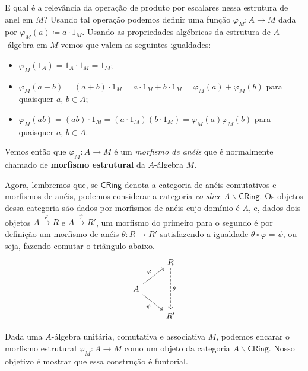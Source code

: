 E qual é a relevância da operação de produto por escalares nessa estrutura de anel em $M$?
Usando tal operação podemos definir uma função $\varphi_M: A \to M$ dada por $\varphi_M(a) \coloneqq a \cdot 1_M$.
Usando as propriedades algébricas da estrutura de $A$-álgebra em $M$ vemos que valem as seguintes igualdades:
\begin{itemize}
\item $\varphi_M(1_A) = 1_A \cdot 1_M = 1_M$;
  
\item $\varphi_M(a+b) = (a+b) \cdot 1_M = a \cdot 1_M + b \cdot 1_M = \varphi_M(a) + \varphi_M(b)$ para quaisquer $a,\, b \in A$;
  
\item $\varphi_M(ab) = (ab) \cdot 1_M = (a \cdot 1_M)(b \cdot 1_M) = \varphi_M(a)\varphi_M(b)$ para quaisquer $a,\, b \in A$.
\end{itemize}

Vemos então que $\varphi_M: A \to M$ é um \emph{morfismo de anéis} que é normalmente chamado de \textbf{morfismo estrutural} da $A$-álgebra $M$.

Agora, lembremos que, se $\mathsf{CRing}$ denota a categoria de anéis comutativos e morfismos de anéis, podemos considerar a categoria \emph{co-slice} $A\backslash \mathsf{CRing}$.
Os objetos dessa categoria são dados por morfismos de anéis cujo domínio é $A$, e, dados dois objetos $A \overset{\varphi}{\to} R$ e $A \overset{\psi}{\to} R'$, um morfismo do primeiro para o segundo é por definição um morfismo de anéis $\theta: R \to R'$ satisfazendo a igualdade $\theta \circ \varphi = \psi$, ou seja, fazendo comutar o triângulo abaixo.
\begin{displaymath}
  \begin{tikzcd}
    & R
    \arrow[dd, dashed, "\theta"]
    \\ A
    \arrow[ru, "\varphi"]
    \arrow[rd, "\psi" swap]
    \\ & R'
  \end{tikzcd}
\end{displaymath}

Dada uma $A$-álgebra unitária, comutativa e associativa $M$, podemos encarar o morfismo estrutural $\varphi_M: A \to M$ como um objeto da categoria $A \backslash \mathsf{CRing}$.
Nosso objetivo é mostrar que essa construção é funtorial.

